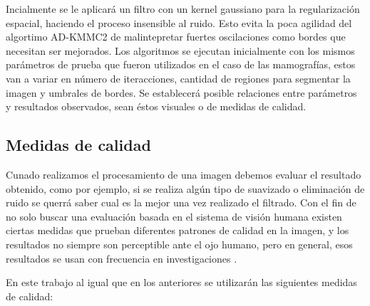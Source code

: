 \documentclass[a4paper,10pt,twocolumn]{article}
\begin{document}
Incialmente se le aplicar\'a un filtro con un kernel gaussiano para la regularizaci\'on espacial, haciendo el proceso insensible al ruido. Esto evita la poca agilidad del algortimo AD-KMMC2 de malintepretar fuertes oscilaciones como bordes que necesitan ser mejorados. Los algoritmos se ejecutan inicialmente con los mismos par\'ametros de prueba que fueron utilizados en el caso de las mamograf\'ias, estos van a variar en n\'umero de iteracciones, cantidad de regiones para segmentar la imagen y umbrales de bordes. Se establecer\'a posible relaciones entre par\'ametros y resultados observados, sean \'estos visuales o de medidas de calidad.
\subsection{Medidas de calidad}\label{sec:medidas_calidad}

Cunado realizamos el procesamiento de una imagen debemos evaluar el resultado obtenido, como por ejemplo, si se realiza alg\'un tipo de suavizado o eliminaci\'on de ruido se querr\'a saber cual es la mejor una vez realizado el filtrado. Con el fin de no solo buscar una evaluaci\'on basada en el  sistema de visi\'on humana existen ciertas medidas que prueban diferentes patrones de calidad en la imagen, y los resultados no siempre son perceptible ante el ojo humano, pero en general, esos resultados se usan con frecuencia en investigaciones \cite{ferrari}.

En este trabajo al igual que en los anteriores se utilizar\'an las siguientes medidas de calidad:
\end{document}
